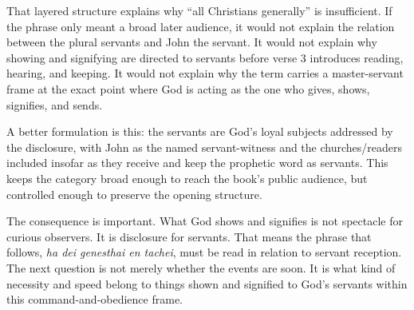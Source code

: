 That layered structure explains why ``all Christians generally'' is insufficient. If the phrase only meant a broad later audience, it would not explain the relation between the plural servants and John the servant. It would not explain why showing and signifying are directed to servants before verse 3 introduces reading, hearing, and keeping. It would not explain why the term carries a master-servant frame at the exact point where God is acting as the one who gives, shows, signifies, and sends.

A better formulation is this: the servants are God's loyal subjects addressed by the disclosure, with John as the named servant-witness and the churches/readers included insofar as they receive and keep the prophetic word as servants. This keeps the category broad enough to reach the book's public audience, but controlled enough to preserve the opening structure.

The consequence is important. What God shows and signifies is not spectacle for curious observers. It is disclosure for servants. That means the phrase that follows, \textit{ha dei genesthai en tachei}, must be read in relation to servant reception. The next question is not merely whether the events are soon. It is what kind of necessity and speed belong to things shown and signified to God's servants within this command-and-obedience frame.
